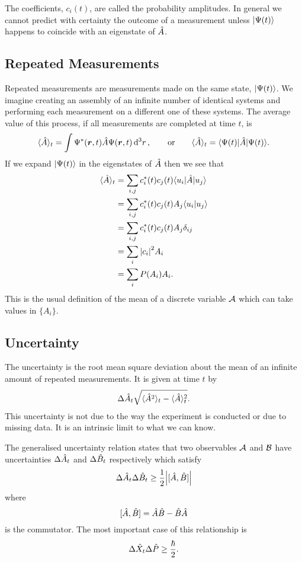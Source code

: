The coefficients, \(c_i(t)\), are called the probability amplitudes.
In general we cannot predict with certainty the outcome of a measurement unless \(\vert {\Psi(t)} \rangle\) happens to coincide with an eigenstate of \(\hat{A}\).

\subsection{Repeated Measurements}
Repeated measurements are measurements made on the same state, \(\vert {\Psi(t)} \rangle\).
We imagine creating an assembly of an infinite number of identical systems and performing each measurement on a different one of these systems.
The average value of this process, if all measurements are completed at time \(t\), is
\[\langle{\hat{A}}\rangle_t = \int \Psi^*(\bm{r}, t)\hat{A}\Psi(\bm{r}, t)\dd[3]{r}, \qquad\text{or}\qquad \langle{\hat{A}}\rangle_t = \langle {\Psi(t)} \vert\hat{A}\vert {\Psi(t)} \rangle.\]
If we expand \(\vert {\Psi(t)} \rangle\) in the eigenstates of \(\hat{A}\) then we see that
\begin{align*}
    \langle{\hat{A}}\rangle_t &= \sum_{i, j} c_i^*(t)c_j(t)\langle {u_i} \vert\hat{A}\vert {u_j} \rangle\\
    &= \sum_{i, j} c_i^*(t)c_j(t) A_j\langle {u_i} \vert {u_j} \rangle\\
    &= \sum_{i, j} c_i^*(t)c_j(t) A_j\delta_{ij}\\
    &= \sum_{i} \abs{c_i}^2A_i\\
    &= \sum_{i} P(A_i)A_i.
\end{align*}
This is the usual definition of the mean of a discrete variable \(\mathcal{A}\) which can take values in \(\{A_i\}\).

\subsection{Uncertainty}
The uncertainty is the root mean square deviation about the mean of an infinite amount of repeated measurements.
It is given at time \(t\) by
\[\Delta\hat{A}_t \sqrt{\langle{\hat{A}^2}\rangle_t - \langle{\hat{A}}\rangle_t^2}.\]
This uncertainty is not due to the way the experiment is conducted or due to missing data.
It is an intrinsic limit to what we can know.

The generalised uncertainty relation states that two observables \(\mathcal{A}\) and \(\mathcal{B}\) have uncertainties \(\Delta \hat{A}_t\) and \(\Delta \hat{B}_t\) respectively which satisfy
\[\Delta \hat{A}_t \Delta \hat{B}_t \ge \frac{1}{2}\abs{[\hat{A}, \hat{B}]}\]
where
\[[\hat{A}, \hat{B}] = \hat{A}\hat{B} - \hat{B}\hat{A}\]
is the commutator.
The most important case of this relationship is
\[\Delta\hat{X}_t\Delta\hat{P} \ge \frac{\hbar}{2}.\]

